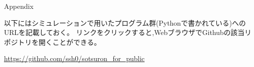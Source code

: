 

\nocite{West04041997}
\nocite{curvature}
\nocite{allo1}
\nocite{allo2}
\nocite{allo3}
\nocite{allo4}
\nocite{allo5}
\nocite{kaigi1}
\nocite{kaigi2}
\nocite{kaigi3}
\nocite{kaigi4}
\nocite{self-organization}



{\Large Appendix}


以下にはシミュレーションで用いたプログラム群(Pythonで書かれている)へのURLを記載しておく。
リンクをクリックすると,WebブラウザでGithubの該当リポジトリを開くことができる。

\href{https://github.com/ssh0/sotsuron_for_public}{https://github.com/ssh0/sotsuron\_for\_public}

